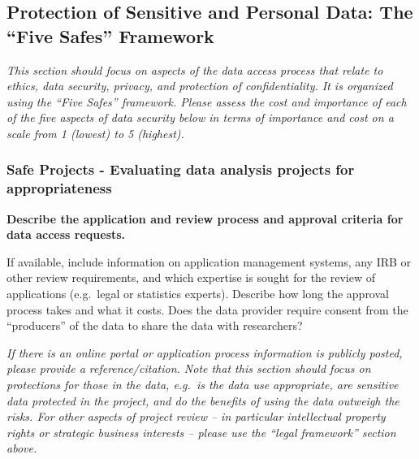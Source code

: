 \documentclass[
]{book}
\begin{document}
\hypertarget{protection-of-sensitive-and-personal-data-the-five-safes-framework-9}{%
\subsection*{Protection of Sensitive and Personal Data: The ``Five Safes'' Framework}\label{protection-of-sensitive-and-personal-data-the-five-safes-framework-9}}

\emph{This section should focus on aspects of the data access process that relate to ethics, data security, privacy, and protection of confidentiality. It is organized using the ``Five Safes'' framework. Please assess the cost and importance of each of the five aspects of data security below in terms of importance and cost on a scale from 1 (lowest) to 5 (highest).}

\hypertarget{safe-projects---evaluating-data-analysis-projects-for-appropriateness}{%
\subsubsection*{Safe Projects - Evaluating data analysis projects for appropriateness}\label{safe-projects---evaluating-data-analysis-projects-for-appropriateness}}

\textbf{Describe the application and review process and approval criteria for data access requests.}

If available, include information on application management systems, any IRB or other review requirements, and which expertise is sought for the review of applications (e.g.~legal or statistics experts). Describe how long the approval process takes and what it costs. Does the data provider require consent from the ``producers'' of the data to share the data with researchers?

\emph{If there is an online portal or application process information is publicly posted, please provide a reference/citation. Note that this section should focus on protections for those in the data, e.g.~is the data use appropriate, are sensitive data protected in the project, and do the benefits of using the data outweigh the risks. For other aspects of project review -- in particular intellectual property rights or strategic business interests -- please use the ``legal framework'' section above.}
\end{document}

